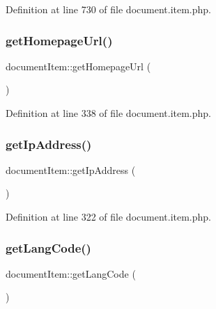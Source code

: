 Definition at line 730 of file document.\+item.\+php.

\hypertarget{classdocumentItem_ab9117599bb123e83289d2a24fd44bf50}{}\label{classdocumentItem_ab9117599bb123e83289d2a24fd44bf50} 
\subsubsection{\texorpdfstring{get\+Homepage\+Url()}{getHomepageUrl()}}
{\footnotesize\ttfamily document\+Item\+::get\+Homepage\+Url (\begin{DoxyParamCaption}{ }\end{DoxyParamCaption})}



Definition at line 338 of file document.\+item.\+php.

\hypertarget{classdocumentItem_ac0e9b0006f067bc0918751148606d325}{}\label{classdocumentItem_ac0e9b0006f067bc0918751148606d325} 
\subsubsection{\texorpdfstring{get\+Ip\+Address()}{getIpAddress()}}
{\footnotesize\ttfamily document\+Item\+::get\+Ip\+Address (\begin{DoxyParamCaption}{ }\end{DoxyParamCaption})}



Definition at line 322 of file document.\+item.\+php.

\hypertarget{classdocumentItem_a7491640a855ace286820cb11f273ddb6}{}\label{classdocumentItem_a7491640a855ace286820cb11f273ddb6} 
\subsubsection{\texorpdfstring{get\+Lang\+Code()}{getLangCode()}}
{\footnotesize\ttfamily document\+Item\+::get\+Lang\+Code (\begin{DoxyParamCaption}{ }\end{DoxyParamCaption})}



